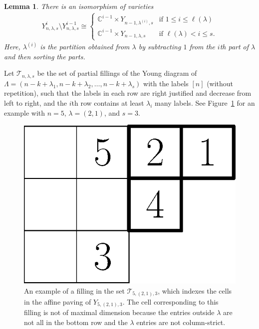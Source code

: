 \documentclass[submission]{FPSAC2021}
\theoremstyle{plain}
\newtheorem{lemma}[theorem]{Lemma}
\numberwithin{equation}{section}
\newcommand{\bC}{\mathbb{C}}
\newcommand{\la}{\lambda}
\begin{document}
\begin{lemma}\label{lem:ProductIso}
There is an isomorphism of varieties
\begin{align}\label{eq:ProductIso}
Y_{n,\la,s}^i \setminus Y_{n,\la,s}^{i-1} \cong \begin{cases} \bC^{i-1} \times Y_{n-1,\la^{(i)},s} & \text{if }1\leq i\leq \ell(\la)\\ \bC^{i-1}\times Y_{n-1,\la,s} & \text{if } \ell(\la)< i\leq s.\end{cases}
\end{align}
Here, $\lambda^{(i)}$ is the partition obtained from $\lambda$ by subtracting $1$ from the $i$th part of $\lambda$ and then sorting the parts.
\end{lemma}

Let $\mathcal{T}_{n,\lambda,s}$ be the set of partial fillings of the Young diagram of $\Lambda = (n-k+\la_1,n-k+\la_2,\dots, n-k+\la_s)$ with the labels $[n]$ (without repetition), such that the labels in each row are right justified and decrease from left to right, and the $i$th row contains at least $\la_i$ many labels. See Figure~\ref{fig:Filling} for an example with $n=5$, $\lambda = (2,1)$, and $s=3$.

\begin{figure}
    \centering
    \includegraphics[scale=0.5]{Filling.eps}
    \caption{An example of a filling in the set $\mathcal{T}_{5,(2,1),3}$, which indexes the cells in the affine paving of $Y_{5,(2,1),3}$. The cell corresponding to this filling is not of maximal dimension because the entries outside $\lambda$ are not all in the bottom row and the $\lambda$ entries are not column-strict.}
    \label{fig:Filling}
\end{figure}
\end{document}
